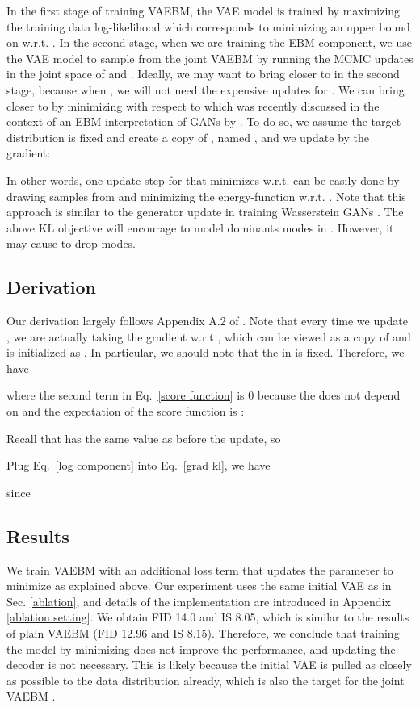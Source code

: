 \documentclass{article} \usepackage{iclr2021_conference,times}
\begin{document}
In the first stage of training VAEBM, the VAE model is trained by maximizing the training data log-likelihood which corresponds to minimizing an upper bound on  w.r.t. . In the second stage, when we are training the EBM component, we use the VAE model to sample from the joint VAEBM by running the MCMC updates in the joint space of  and .  Ideally, we may want to bring  closer to  in the second stage, because when , we will not need the expensive updates for . We can bring  closer to  by minimizing   with respect to  which was recently discussed in the context of an EBM-interpretation of GANs by \citet{che2020your}. To do so, we assume the target distribution  is fixed and create a copy of , named , and we update  by the gradient: 

In other words, one update step for  that minimizes  w.r.t.  can be easily done by drawing samples from  and minimizing the energy-function w.r.t. . Note that this approach is similar to the generator update in training Wasserstein GANs \citep{arjovsky2017wasserstein}. The above KL objective will encourage  to model dominants modes in . However, it may cause  to drop modes.

\subsection{Derivation}
Our derivation largely follows Appendix A.2 of \citet{che2020your}. Note that every time we update , we are actually taking the gradient w.r.t , which can be viewed as a copy of  and is initialized as . In particular, we should note that the  in  is fixed. Therefore, we have

where the second term in Eq.~\ref{score function} is 0 because the  does not depend on  and the expectation of the score function is :

Recall that  has the same value as  before the update, so 

Plug Eq.~\ref{log component} into Eq.~\ref{grad kl}, we have 

since 


\subsection{Results}
We train VAEBM with an additional loss term that updates the parameter  to minimize  as explained above. Our experiment uses the same initial VAE as in Sec. \ref{ablation}, and details of the implementation are introduced in Appendix \ref{ablation setting}. We obtain FID 14.0 and IS 8.05, which is similar to the results of plain VAEBM (FID  12.96 and IS 8.15). Therefore, we conclude that training the model by minimizing  does not improve the performance, and updating the decoder is not necessary. This is likely because the initial VAE is pulled as closely as possible to the data distribution already, which is also the target for the joint VAEBM .
\end{document}
